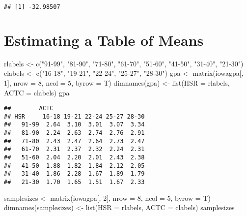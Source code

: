\documentclass[
]{book}
\newenvironment{Shaded}{\begin{snugshade}}{\end{snugshade}}
\newcommand{\AttributeTok}[1]{\textcolor[rgb]{0.77,0.63,0.00}{#1}}
\newcommand{\DecValTok}[1]{\textcolor[rgb]{0.00,0.00,0.81}{#1}}
\newcommand{\FunctionTok}[1]{\textcolor[rgb]{0.00,0.00,0.00}{#1}}
\newcommand{\NormalTok}[1]{#1}
\newcommand{\OtherTok}[1]{\textcolor[rgb]{0.56,0.35,0.01}{#1}}
\newcommand{\StringTok}[1]{\textcolor[rgb]{0.31,0.60,0.02}{#1}}
\begin{document}
\begin{verbatim}
## [1] -32.98507
\end{verbatim}

\hypertarget{estimating-a-table-of-means}{%
\section{Estimating a Table of Means}\label{estimating-a-table-of-means}}

\begin{Shaded}
\begin{Highlighting}[]
\NormalTok{rlabels }\OtherTok{\textless{}{-}} \FunctionTok{c}\NormalTok{(}\StringTok{"91{-}99"}\NormalTok{, }\StringTok{"81{-}90"}\NormalTok{, }\StringTok{"71{-}80"}\NormalTok{, }
             \StringTok{"61{-}70"}\NormalTok{, }\StringTok{"51{-}60"}\NormalTok{, }\StringTok{"41{-}50"}\NormalTok{,}
             \StringTok{"31{-}40"}\NormalTok{, }\StringTok{"21{-}30"}\NormalTok{)}
\NormalTok{clabels }\OtherTok{\textless{}{-}} \FunctionTok{c}\NormalTok{(}\StringTok{"16{-}18"}\NormalTok{, }\StringTok{"19{-}21"}\NormalTok{, }\StringTok{"22{-}24"}\NormalTok{, }
             \StringTok{"25{-}27"}\NormalTok{, }\StringTok{"28{-}30"}\NormalTok{)}
\NormalTok{gpa }\OtherTok{\textless{}{-}} \FunctionTok{matrix}\NormalTok{(iowagpa[, }\DecValTok{1}\NormalTok{], }
              \AttributeTok{nrow =} \DecValTok{8}\NormalTok{, }\AttributeTok{ncol =} \DecValTok{5}\NormalTok{, }\AttributeTok{byrow =}\NormalTok{ T)}
\FunctionTok{dimnames}\NormalTok{(gpa) }\OtherTok{\textless{}{-}} \FunctionTok{list}\NormalTok{(}\AttributeTok{HSR =}\NormalTok{ rlabels, }
                      \AttributeTok{ACTC =}\NormalTok{ clabels)}
\NormalTok{gpa}
\end{Highlighting}
\end{Shaded}

\begin{verbatim}
##        ACTC
## HSR     16-18 19-21 22-24 25-27 28-30
##   91-99  2.64  3.10  3.01  3.07  3.34
##   81-90  2.24  2.63  2.74  2.76  2.91
##   71-80  2.43  2.47  2.64  2.73  2.47
##   61-70  2.31  2.37  2.32  2.24  2.31
##   51-60  2.04  2.20  2.01  2.43  2.38
##   41-50  1.88  1.82  1.84  2.12  2.05
##   31-40  1.86  2.28  1.67  1.89  1.79
##   21-30  1.70  1.65  1.51  1.67  2.33
\end{verbatim}

\begin{Shaded}
\begin{Highlighting}[]
\NormalTok{samplesizes }\OtherTok{\textless{}{-}} \FunctionTok{matrix}\NormalTok{(iowagpa[, }\DecValTok{2}\NormalTok{], }
                  \AttributeTok{nrow =} \DecValTok{8}\NormalTok{, }\AttributeTok{ncol =} \DecValTok{5}\NormalTok{, }\AttributeTok{byrow =}\NormalTok{ T)}
\FunctionTok{dimnames}\NormalTok{(samplesizes) }\OtherTok{\textless{}{-}} \FunctionTok{list}\NormalTok{(}\AttributeTok{HSR =}\NormalTok{ rlabels, }
                              \AttributeTok{ACTC =}\NormalTok{ clabels)}
\NormalTok{samplesizes}
\end{Highlighting}
\end{Shaded}
\end{document}
